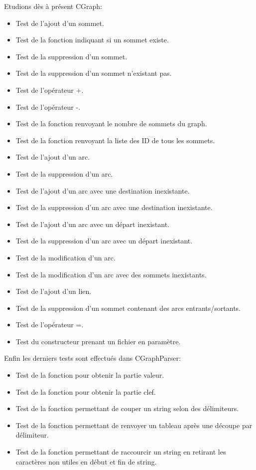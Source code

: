 		Etudions dès à présent CGraph:
		\begin{itemize}
			\item Test de l'ajout d'un sommet.
			\item Test de la fonction indiquant si un sommet existe.
			\item Test de la suppression d'un sommet.
			\item Test de la suppression d'un sommet n'existant pas.
			\item Test de l'opérateur +.
			\item Test de l'opérateur -.
			\item Test de la fonction renvoyant le nombre de sommets du graph.
			\item Test de la fonction renvoyant la liste des ID de tous les sommets.
			\item Test de l'ajout d'un arc.
			\item Test de la suppression d'un arc.
			\item Test de l'ajout d'un arc avec une destination inexistante.
			\item Test de la suppression d'un arc avec une destination inexistante.
			\item Test de l'ajout d'un arc avec un départ inexistant.
			\item Test de la suppression d'un arc avec un départ inexistant.
			\item Test de la modification d'un arc.
			\item Test de la modification d'un arc avec des sommets inexistants.
			\item Test de l'ajout d'un lien.
			\item Test de la suppression d'un sommet contenant des arcs entrants/sortants.
			\item Test de l'opérateur =.
			\item Test du constructeur prenant un fichier en paramètre.
		\end{itemize}
		
		Enfin les derniers tests sont effectués dans CGraphParser:
		\begin{itemize}
			\item Test de la fonction pour obtenir la partie valeur.
			\item Test de la fonction pour obtenir la partie clef.
			\item Test de la fonction permettant de couper un string selon des délimiteurs.
			\item Test de la fonction permettant de renvoyer un tableau après une découpe par délimiteur.
			\item Test de la fonction permettant de raccourcir un string en retirant les caractères non utiles en début et fin de string.
		\end{itemize}
	
